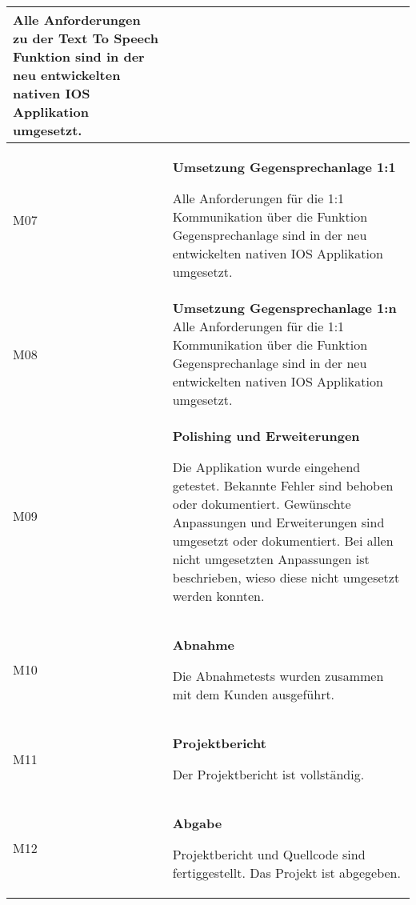 \begin{table}[h]
\begin{tabular}{|l|p{15cm}|}
        Alle Anforderungen zu der Text To Speech Funktion sind in der neu entwickelten nativen IOS Applikation umgesetzt. \\
        \hline

        M07         & \textbf{Umsetzung Gegensprechanlage 1:1}

        Alle Anforderungen für die 1:1 Kommunikation über die Funktion Gegensprechanlage sind in der neu entwickelten nativen IOS Applikation umgesetzt. \\
        \hline

        M08         & \textbf{Umsetzung Gegensprechanlage 1:n}
        Alle Anforderungen für die 1:1 Kommunikation über die Funktion Gegensprechanlage sind in der neu entwickelten nativen IOS Applikation umgesetzt. \\
        \hline

        M09         & \textbf{Polishing und Erweiterungen}

        Die Applikation wurde eingehend getestet.
        Bekannte Fehler sind behoben oder dokumentiert.
        Gewünschte Anpassungen und Erweiterungen sind umgesetzt oder dokumentiert.
        Bei allen nicht umgesetzten Anpassungen ist beschrieben, wieso diese nicht umgesetzt werden konnten.
        \\
        \hline

        M10         & \textbf{Abnahme}

        Die Abnahmetests wurden zusammen mit dem Kunden ausgeführt. \\
        \hline

        M11         & \textbf{Projektbericht}

        Der Projektbericht ist vollständig.\\
        \hline

        M12         & \textbf{Abgabe}

        Projektbericht und Quellcode sind fertiggestellt.
        Das Projekt ist abgegeben.\\
        \hline



    \end{tabular}\label{tab:milestones}
\end{table}

\clearpage
